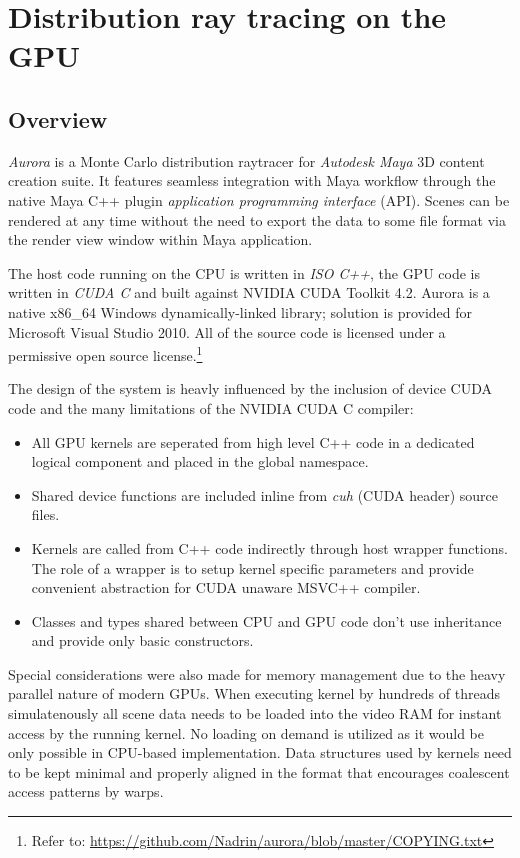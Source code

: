 \chapter{Distribution ray tracing on the GPU}

\section{Overview}
\emph{Aurora} is a Monte Carlo distribution raytracer for \emph{Autodesk Maya} 3D content creation suite. It features seamless integration with Maya workflow through the native Maya C++ plugin \emph{application programming interface} (API). Scenes can be rendered at any time without the need to export the data to some file format via the render view window within Maya application.

The host code running on the CPU is written in \emph{ISO C++}, the GPU code is written in \emph{CUDA C} and built against NVIDIA CUDA Toolkit 4.2. Aurora is a native x86\_64 Windows dynamically-linked library; solution is provided for Microsoft Visual Studio 2010. All of the source code is licensed under a permissive open source license.\footnote{Refer to: \url{https://github.com/Nadrin/aurora/blob/master/COPYING.txt}}

The design of the system is heavly influenced by the inclusion of device CUDA code and the many limitations of the NVIDIA CUDA C compiler:
\begin{itemize}
\item All GPU kernels are seperated from high level C++ code in a dedicated logical component and placed in the global namespace.
\item Shared device functions are included inline from \emph{cuh} (CUDA header) source files.
\item Kernels are called from C++ code indirectly through host wrapper functions. The role of a wrapper is to setup kernel specific parameters and provide convenient abstraction for CUDA unaware MSVC++ compiler.
\item Classes and types shared between CPU and GPU code don't use inheritance and provide only basic constructors.
\end{itemize}
Special considerations were also made for memory management due to the heavy parallel nature of modern GPUs. When executing kernel by hundreds of threads simulatenously all scene data needs to be loaded into the video RAM for instant access by the running kernel. No loading on demand is utilized as it would be only possible in CPU-based implementation. Data structures used by kernels need to be kept minimal and properly aligned in the format that encourages coalescent access patterns by warps.

